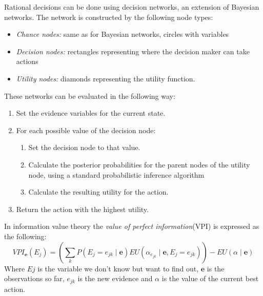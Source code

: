 \documentclass[11pt, letterpaper]{report}
\numberwithin{equation}{section}
\begin{document}
Rational decisions can be done using decision networks, an extension of Bayesian
networks. The network is constructed by the following node types:
\begin{itemize}
\item \emph{Chance nodes:} same as for Bayesian networks, circles with variables
\item \emph{Decision nodes:} rectangles representing where the decision maker
  can take actions
\item \emph{Utility nodes:} diamonds representing the utility function.
\end{itemize}
These networks can be evaluated in the following way:

\begin{enumerate}
\item Set the evidence variables for the current state.
\item For each possible value of the decision node:
  \begin{enumerate}
  \item Set the decision node to that value.
  \item Calculate the posterior probabilities for the parent nodes of the
    utility node, using a standard probabilistic inference algorithm
  \item Calculate the resulting utility for the action.
  \end{enumerate}
\item Return the action with the highest utility.
\end{enumerate}

In information value theory the \emph{value of perfect information}(VPI) is
expressed as the following:
\[VPI_{ \boldsymbol{e} } (E_j) = (\sum_k P(E_j=e_{jk} \mid \boldsymbol{e})
  EU(\alpha_{e_{jk}} \mid \boldsymbol{e}, E_j = e_{jk}) ) - EU(\alpha \mid \boldsymbol{e}) \]
Where $Ej$ is the variable we don't know but want to find out, $\boldsymbol{e}$
is the observations so far, $e_{jk}$ is the new evidence and $\alpha$ is the value of the current best action.
\end{document}
